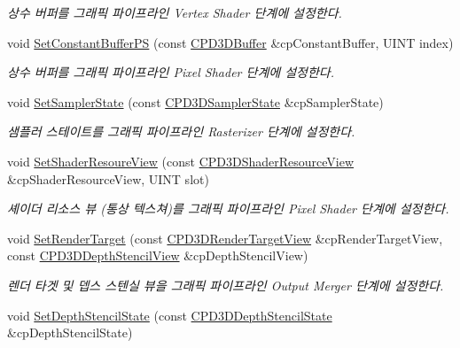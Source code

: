 \begin{DoxyCompactItemize}
\begin{DoxyCompactList}\small\item\em 상수 버퍼를 그래픽 파이프라인 Vertex Shader 단계에 설정한다. \end{DoxyCompactList}\item 
void \hyperlink{class_m_n_l_1_1_mn_render_a_p_i_acbefa74f1c90c96711515e9dec3e711f}{Set\+Constant\+Buffer\+PS} (const \hyperlink{namespace_m_n_l_aab9c90a8c27ac6410a9cc7cd89efeef1}{C\+P\+D3\+D\+Buffer} \&cp\+Constant\+Buffer, U\+I\+NT index)
\begin{DoxyCompactList}\small\item\em 상수 버퍼를 그래픽 파이프라인 Pixel Shader 단계에 설정한다. \end{DoxyCompactList}\item 
void \hyperlink{class_m_n_l_1_1_mn_render_a_p_i_a3d3c68e7fe4912e974d89ceeb357793e}{Set\+Sampler\+State} (const \hyperlink{namespace_m_n_l_ae0141196161ecb3d3055523077ca3aa1}{C\+P\+D3\+D\+Sampler\+State} \&cp\+Sampler\+State)
\begin{DoxyCompactList}\small\item\em 샘플러 스테이트를 그래픽 파이프라인 Rasterizer 단계에 설정한다. \end{DoxyCompactList}\item 
void \hyperlink{class_m_n_l_1_1_mn_render_a_p_i_a81810b5ebbfc1fe9cec78ed9e63ab0b0}{Set\+Shader\+Resoure\+View} (const \hyperlink{namespace_m_n_l_a93794d93663474ff79c950ed985565aa}{C\+P\+D3\+D\+Shader\+Resource\+View} \&cp\+Shader\+Resource\+View, U\+I\+NT slot)
\begin{DoxyCompactList}\small\item\em 셰이더 리소스 뷰 (통상 텍스쳐)를 그래픽 파이프라인 Pixel Shader 단계에 설정한다. \end{DoxyCompactList}\item 
void \hyperlink{class_m_n_l_1_1_mn_render_a_p_i_ab9fc7cb2fe9b1dd79b66fe2f169fa46a}{Set\+Render\+Target} (const \hyperlink{namespace_m_n_l_aa08a7c0b5ac9d877dacb57b9306b7b8c}{C\+P\+D3\+D\+Render\+Target\+View} \&cp\+Render\+Target\+View, const \hyperlink{namespace_m_n_l_a12b3c209d76ede855300e637f4192a04}{C\+P\+D3\+D\+Depth\+Stencil\+View} \&cp\+Depth\+Stencil\+View)
\begin{DoxyCompactList}\small\item\em 렌더 타겟 및 뎁스 스텐실 뷰을 그래픽 파이프라인 Output Merger 단계에 설정한다. \end{DoxyCompactList}\item 
void \hyperlink{class_m_n_l_1_1_mn_render_a_p_i_a4780504d046ae21574324f55d9799ea3}{Set\+Depth\+Stencil\+State} (const \hyperlink{namespace_m_n_l_a8209b06065c025e5d6bc2e8ee5925faf}{C\+P\+D3\+D\+Depth\+Stencil\+State} \&cp\+Depth\+Stencil\+State)

\end{DoxyCompactItemize}
